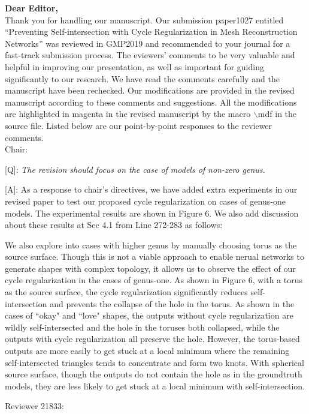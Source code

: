 \documentclass[10pt]{letter} %
\newcommand{\mdf}[1]{\textcolor[rgb]{1.00,0.00,1.00}{#1}}
\begin{document}
	\textbf{Dear Editor,}\\
	Thank you for handling our manuscript. Our submission paper1027 entitled ``Preventing Self-intersection with Cycle Regularization in Mesh
	Reconstruction Networks'' was reviewed in GMP2019 and recommended to your journal for a fast-track submission process. The eviewers’ comments to be very valuable and helpful in improving our presentation, as well as important for guiding significantly to our research. We have read the comments carefully and the manuscript have been rechecked. Our modifications are provided in the revised manuscript according to these comments and suggestions. All the modifications are \mdf{highlighted in magenta} in the revised manuscript by the macro $\backslash$mdf in the source file. Listed below are our point-by-point responses to the reviewer comments.\\
	
	\hdashrule{\linewidth}{1pt}{1mm}
	Chair:
	
	[Q]: \emph{The revision should focus on the case of models of non-zero genus.}
	
	[A]: As a response to chair's directives, we have added extra experiments in our revised paper to test our proposed cycle regularization on cases of genus-one models. The experimental results are shown in Figure 6. We also add discussion about these results at Sec 4.1 from Line 272-283 as follows:
	 
	\mdf{We also explore into cases with higher genus by manually choosing torus as the source surface. Though this is not a viable approach to enable nerual networks to generate shapes with complex topology, it allows us to observe the effect of our cycle regularization in the cases of genus-one. As shown in Figure 6, with a torus as the source surface, the cycle regularization significantly reduces self-intersection and prevents the collapse of the hole in the torus. As shown in the cases of ``okay" and ``love" shapes, the outputs without cycle regularization are wildly self-intersected and the hole in the toruses both collapsed, while the outputs with cycle regularization all preserve the hole.  However, the torus-based outputs are more easily to get stuck at a local minimum where the remaining self-intersected triangles tends to concentrate and form two knots. With spherical source surface, though the outputs do not contain the hole as in the groundtruth models, they are less likely to get stuck at a local minimum with self-intersection.
	}
	
	\hdashrule{\linewidth}{1pt}{1mm}
	Reviewer 21833:
	
\end{document}

